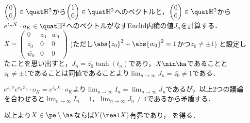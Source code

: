 \begin{npfwn}
  $
  \begin{pmatrix}
    0 \\ 0 
  \end{pmatrix}
  \in \quat\mathbb{H}^2 $から$
  \begin{pmatrix}
    1 \\ 0
  \end{pmatrix}
  \in \quat\mathbb{H}^2 $へのベクトルと，$
  \begin{pmatrix}
    0 \\ 0 
  \end{pmatrix}
  \in \quat\mathbb{H}^2 $から$e^{t_nX}\cdot o_K \in \quat \mathbb{H}^2 $へのベクトルがなすEuclid内積の値$J_n$を計算する．$X =   \begin{pmatrix}
    0 & z_0 & w_0 \\
    \bar{z_0} & 0 & 0 \\
    \bar{w_0} & 0 & 0 
  \end{pmatrix}$ (ただし$\abs{z_0}^2 + \abs{w_0}^2 = 1 $かつ$z_0\neq \pm 1 $) と設定したことを思い出すと，$J_n = \bar{z_0}\tanh (t_n) $であり，$X\nin \ha $であることと$z_0\neq \pm 1$であることは同値であることより$\lim_{n\to \infty}J_n = \bar{z_0}\neq 1 $である．%

  $e^{s_n Y}e^{r_n Z_n}\cdot o_K = e^{t_n X}\cdot o_K$より$ \lim_{n\to \infty} I_n = \lim_{n\to \infty}J_n  $であるが，以上2つの議論を合わせると$\lim_{n\to \infty} I_n= 1$，$\lim_{n\to \infty}J_n \neq 1 $であるから矛盾する．
  

  以上より$X\in \pe\setminus\ha$ならば$Y(\real X) $有界であり， を得る．  
\end{npfwn}


